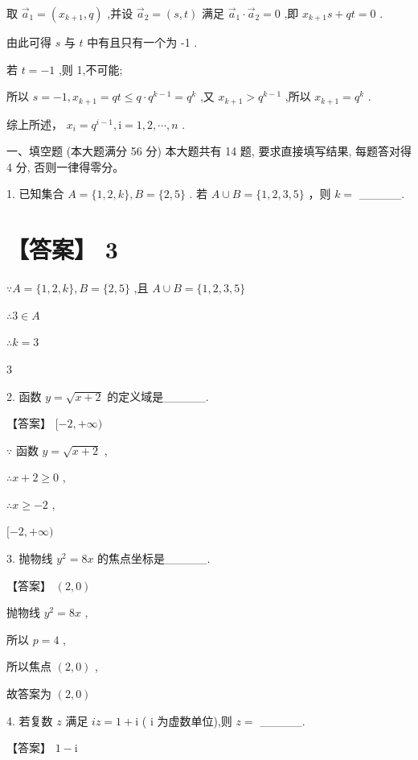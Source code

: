 \documentclass[10pt]{article}
\begin{document}
取 \({\overrightarrow{a}}_{1} = \left( {{x}_{k + 1},q}\right)\) ,并设 \({\overrightarrow{a}}_{2} = \left( {s,t}\right)\) 满足 \({\overrightarrow{a}}_{1} \cdot  {\overrightarrow{a}}_{2} = 0\) ,即 \({x}_{k + 1}s + {qt} = 0\) .

由此可得 \(s\) 与 \(t\) 中有且只有一个为 -1 .

若 \(t =  - 1\) ,则 1,不可能;

所以 \(s =  - 1,{x}_{k + 1} = {qt} \leq  q \cdot  {q}^{k - 1} = {q}^{k}\) ,又 \({x}_{k + 1} > {q}^{k - 1}\) ,所以 \({x}_{k + 1} = {q}^{k}\) .

综上所述， \({x}_{i} = {q}^{i - 1},\mathrm{i} = 1,2,\cdots ,n\) .

一、填空题 (本大题满分 56 分) 本大题共有 14 题, 要求直接填写结果, 每题答对得 4 分, 否则一律得零分。

1. 已知集合 \(A = \{ 1,2,k\} ,B = \{ 2,5\}\) . 若 \(A \cup  B = \{ 1,2,3,5\}\) ，则 \(k =\) \_\_\_\_\_.

\section*{【答案】 3}

\(\because A = \{ 1,2,k\} ,B = \{ 2,5\}\) ,且 \(A \cup  B = \{ 1,2,3,5\}\)

\(\therefore 3 \in  A\)

\(\therefore k = 3\)

3

2. 函数 \(y = \sqrt{x + 2}\) 的定义域是\_\_\_\_\_.

【答案】 \(\lbrack  - 2, + \infty )\)

\(\because\) 函数 \(y = \sqrt{x + 2}\) ,

\(\therefore x + 2 \geq  0\) ,

\(\therefore x \geq   - 2\) ,

\(\lbrack  - 2, + \infty )\)

3. 抛物线 \({y}^{2} = {8x}\) 的焦点坐标是\_\_\_\_\_.

【答案】 \(\left( {2,0}\right)\)

抛物线 \({y}^{2} = {8x}\) ,

所以 \(p = 4\) ,

所以焦点 \(\left( {2,0}\right)\) ,

故答案为 \(\left( {2,0}\right)\)

4. 若复数 \(z\) 满足 \({iz} = 1 + \mathrm{i}\) ( \(\mathrm{i}\) 为虚数单位),则 \(z =\) \_\_\_\_\_.

【答案】 \(1 - \mathrm{i}\)
\end{document}
